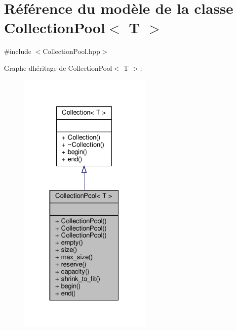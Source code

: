 \hypertarget{class_collection_pool}{}\section{Référence du modèle de la classe Collection\+Pool$<$ T $>$}
\label{class_collection_pool}


{\ttfamily \#include $<$Collection\+Pool.\+hpp$>$}



Graphe d\textquotesingle{}héritage de Collection\+Pool$<$ T $>$\+:\nopagebreak
\begin{figure}[H]
\begin{center}
\leavevmode
\includegraphics[width=184pt]{class_collection_pool__inherit__graph}
\end{center}
\end{figure}


